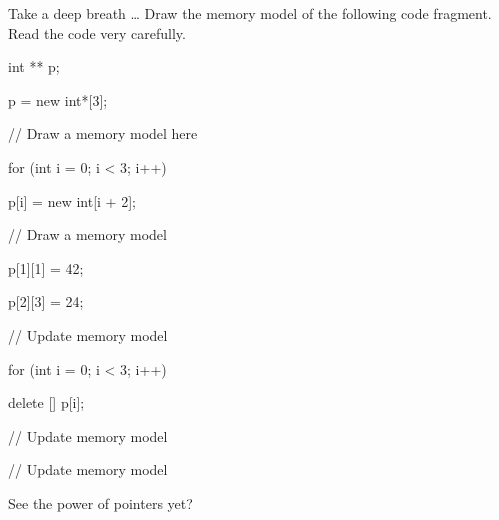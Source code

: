 Take a deep breath \ldots{} Draw the memory model of the following code fragment. Read the code very carefully.



\begin{consolethree}[escapeinside=||]

int ** p;

p = new int*[3];

// Draw a memory model here

for (int i = 0; i < 3; i++)

{

    p[i] = new int[i + 2];

    // Draw a memory model

}

p[1][1] = 42;

p[2][3] = 24;

// Update memory model

for (int i = 0; i < 3; i++)

{

    delete [] p[i];

    // Update memory model

}

// Update memory model

\end{consolethree}



See the power of pointers yet?

